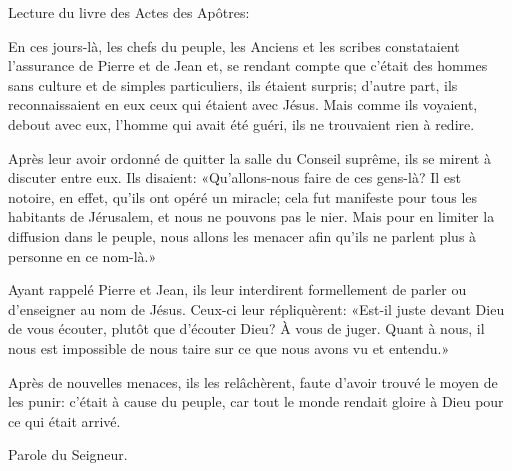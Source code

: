 \indent Lecture du livre des Actes des Apôtres:

En ces jours-là, les chefs du peuple, les Anciens et les scribes constataient l’assurance de Pierre et de Jean et, se rendant compte que c’était des hommes sans culture et de simples particuliers, ils étaient surpris; d’autre part, ils reconnaissaient en eux ceux qui étaient avec Jésus. Mais comme ils voyaient, debout avec eux, l’homme qui avait été guéri, ils ne trouvaient rien à redire.

Après leur avoir ordonné de quitter la salle du Conseil suprême, ils se mirent à discuter entre eux. Ils disaient: «Qu’allons-nous faire de ces gens-là? Il est notoire, en effet, qu’ils ont opéré un miracle; cela fut manifeste pour tous les habitants de Jérusalem, et nous ne pouvons pas le nier. Mais pour en limiter la diffusion dans le peuple, nous allons les menacer afin qu’ils ne parlent plus à personne en ce nom-là.»

Ayant rappelé Pierre et Jean, ils leur interdirent formellement de parler ou d’enseigner au nom de Jésus. Ceux-ci leur répliquèrent: «Est-il juste devant Dieu de vous écouter, plutôt que d’écouter Dieu? À vous de juger. Quant à nous, il nous est impossible de nous taire sur ce que nous avons vu et entendu.»

Après de nouvelles menaces, ils les relâchèrent, faute d’avoir trouvé le moyen de les punir: c’était à cause du peuple, car tout le monde rendait gloire à Dieu pour ce qui était arrivé.

Parole du Seigneur.